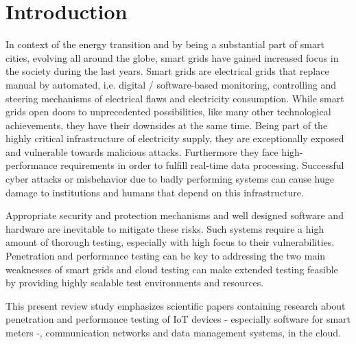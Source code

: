 \section{Introduction}
In context of the energy transition and by being a substantial part of smart cities, evolving all around the globe, smart grids have gained increased focus in the society during the last years. Smart grids are electrical grids that replace manual by automated, i.e. digital / software-based monitoring, controlling and steering mechanisms of electrical flaws and electricity consumption. While smart grids open doors to unprecedented possibilities, like many other technological achievements, they have their downsides at the same time. Being part of the highly critical infrastructure of electricity supply, they are exceptionally exposed and vulnerable towards malicious attacks. Furthermore they face high-performance requirements in order to fulfill real-time data processing. Successful cyber attacks or misbehavior due to badly performing systems can cause huge damage to institutions and humans that depend on this infrastructure.

Appropriate security and protection mechanisms and well designed software and hardware are inevitable to mitigate these risks. Such systems require a high amount of thorough testing, especially with high focus to their vulnerabilities. Penetration and performance testing can be key to addressing the two main weaknesses of smart grids and cloud testing can make extended testing feasible by providing highly scalable test environments and resources.

This present review study emphasizes scientific papers containing research about penetration and performance testing of IoT devices - especially software for smart meters -, communication networks and data management systems, in the cloud.
